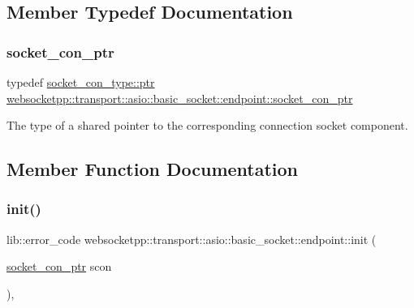 \subsection{Member Typedef Documentation}
\mbox{\label{classwebsocketpp_1_1transport_1_1asio_1_1basic__socket_1_1endpoint_afe9d86dd3fe9e8c73087f22daafcd70c}} 
\subsubsection{\texorpdfstring{socket\+\_\+con\+\_\+ptr}{socket\_con\_ptr}}
{\footnotesize\ttfamily typedef \mbox{\hyperlink{classwebsocketpp_1_1transport_1_1asio_1_1basic__socket_1_1connection_a1a4fa6887235c53c7ddd13307798b280}{socket\+\_\+con\+\_\+type\+::ptr}} \mbox{\hyperlink{classwebsocketpp_1_1transport_1_1asio_1_1basic__socket_1_1endpoint_afe9d86dd3fe9e8c73087f22daafcd70c}{websocketpp\+::transport\+::asio\+::basic\+\_\+socket\+::endpoint\+::socket\+\_\+con\+\_\+ptr}}}

The type of a shared pointer to the corresponding connection socket component. 

\subsection{Member Function Documentation}
\mbox{\label{classwebsocketpp_1_1transport_1_1asio_1_1basic__socket_1_1endpoint_a33e5c5a9086204933d3d2b3cacef4236}} 
\subsubsection{\texorpdfstring{init()}{init()}}
{\footnotesize\ttfamily lib\+::error\+\_\+code websocketpp\+::transport\+::asio\+::basic\+\_\+socket\+::endpoint\+::init (\begin{DoxyParamCaption}\item[{\mbox{\hyperlink{classwebsocketpp_1_1transport_1_1asio_1_1basic__socket_1_1endpoint_afe9d86dd3fe9e8c73087f22daafcd70c}{socket\+\_\+con\+\_\+ptr}}}]{scon }\end{DoxyParamCaption})\hspace{0.3cm}{\ttfamily [inline]}, {\ttfamily [protected]}}



